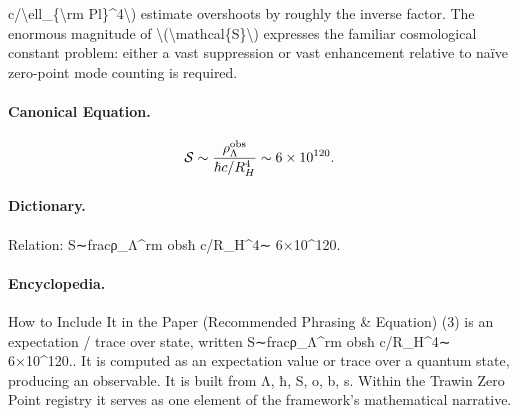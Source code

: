 c/\textbackslash{}ell\_\{\textbackslash{}rm Pl\}\textasciicircum{}4\textbackslash{}) estimate overshoots by roughly the inverse factor. The enormous magnitude of \textbackslash{}(\textbackslash{}mathcal\{S\}\textbackslash{}) expresses the familiar cosmological constant problem: either a vast suppression or vast enhancement relative to naïve zero-point mode counting is required.

\paragraph{Canonical Equation.}
\[
\mathcal{S}\sim\frac{\rho_\Lambda^{\rm obs}}{\hbar c/R_H^4}\sim 6\times10^{120}.
\]

\paragraph{Dictionary.}
Relation: S∼fracρ\_Λ\textasciicircum{}rm obsħ c/R\_H\textasciicircum{}4∼ 6×10\textasciicircum{}120.

\paragraph{Encyclopedia.}
How to Include It in the Paper (Recommended Phrasing \& Equation) (3) is an expectation / trace over state, written S∼fracρ\_Λ\textasciicircum{}rm obsħ c/R\_H\textasciicircum{}4∼ 6×10\textasciicircum{}120.. It is computed as an expectation value or trace over a quantum state, producing an observable. It is built from Λ, ħ, S, o, b, s. Within the Trawin Zero Point registry it serves as one element of the framework's mathematical narrative.
